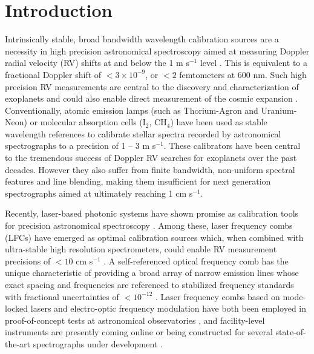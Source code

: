 \documentclass[10pt]{article}
\newcommand{\ms}{{m s$^{-1}$}}
\begin{document}
\section{Introduction}
Intrinsically stable, broad bandwidth wavelength calibration sources are a necessity in high precision astronomical spectroscopy aimed at measuring Doppler radial velocity (RV) shifts at and below the 1 {\ms} level \cite {Fischer:2016}.  This is equivalent to a fractional Doppler shift of $<3\times 10^{-9}$, or $<2$ femtometers at 600 nm. Such high precision RV measurements are central to the discovery and characterization of exoplanets \cite{Mayor:2003} and could also enable direct measurement of the cosmic expansion \cite{Pasquini:2010}. Conventionally, atomic emission lamps (such as Thorium-Agron and Uranium-Neon) \cite{Mayor:2003, Redman:2011} or molecular absorption cells (I$_2$, CH$_4$) \cite{Butler:1996,Plavchan:2013} have been used as stable wavelength references to calibrate stellar spectra recorded by astronomical spectrographs to a precision of 1 -- 3 {\ms}. These calibrators have been central to the tremendous success of Doppler RV searches for exoplanets over the past decades.  However they also suffer from finite bandwidth, non-uniform spectral features and line blending, making them insufficient for next generation spectrographs aimed at ultimately reaching 1 c{\ms}. 

Recently, laser-based photonic systems have shown promise as calibration tools for precision astronomical spectroscopy \cite{Li:2008, Molaro:2013, Murphy:2007, Philips:2012, Ycas:2012}.  Among these, laser frequency combs (LFCs) have emerged as optimal calibration sources which, when combined with ultra-stable high resolution spectrometers, could enable RV measurement precisions of $<10$ c{\ms} \cite{Probst:2014,Wilken:2012}. A self-referenced optical frequency comb has the unique characteristic of providing a broad array of narrow emission lines whose exact spacing and frequencies are referenced to stabilized frequency standards with fractional uncertainties of $<10^{-12}$ \cite{Quinlan:2010,Ycas:2012}.  Laser frequency combs based on mode-locked lasers and electro-optic frequency modulation have both been employed in proof-of-concept tests at astronomical observatories \cite{Ycas:2012, Philips:2012, Molaro:2013,Kotani:2014,Yi:2016}, and facility-level instruments are presently coming online or being constructed for several state-of-the-art spectrographs under development \cite{Mahadevan:2014a, Pepe:2014b, Kotani:2014, Jurgenson:2016}.
\end{document}
